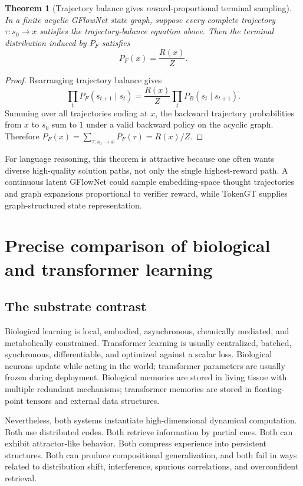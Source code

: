 \documentclass[11pt]{article}
\newtheorem{theorem}[definition]{Theorem}
\newcommand{\1}{\mathbf{1}}
\begin{document}
\begin{theorem}[Trajectory balance gives reward-proportional terminal sampling]
In a finite acyclic GFlowNet state graph, suppose every complete trajectory $\tau:s_0\to x$ satisfies the trajectory-balance equation above. Then the terminal distribution induced by $P_F$ satisfies
\[
P_F(x)=\frac{R(x)}{Z}.
\]
\end{theorem}
\begin{proof}
Rearranging trajectory balance gives
\[
\prod_t P_F(s_{t+1}\mid s_t)=\frac{R(x)}{Z}\prod_t P_B(s_t\mid s_{t+1}).
\]
Summing over all trajectories ending at $x$, the backward trajectory probabilities from $x$ to $s_0$ sum to $1$ under a valid backward policy on the acyclic graph. Therefore $P_F(x)=\sum_{\tau:s_0\to x}P_F(\tau)=R(x)/Z$.
\end{proof}

For language reasoning, this theorem is attractive because one often wants diverse high-quality solution paths, not only the single highest-reward path. A continuous latent GFlowNet could sample embedding-space thought trajectories and graph expansions proportional to verifier reward, while TokenGT supplies graph-structured state representation.

\section{Precise comparison of biological and transformer learning}

\subsection{The substrate contrast}

Biological learning is local, embodied, asynchronous, chemically mediated, and metabolically constrained. Transformer learning is usually centralized, batched, synchronous, differentiable, and optimized against a scalar loss. Biological neurons update while acting in the world; transformer parameters are usually frozen during deployment. Biological memories are stored in living tissue with multiple redundant mechanisms; transformer memories are stored in floating-point tensors and external data structures.

Nevertheless, both systems instantiate high-dimensional dynamical computation. Both use distributed codes. Both retrieve information by partial cues. Both can exhibit attractor-like behavior. Both compress experience into persistent structures. Both can produce compositional generalization, and both fail in ways related to distribution shift, interference, spurious correlations, and overconfident retrieval.
\end{document}
